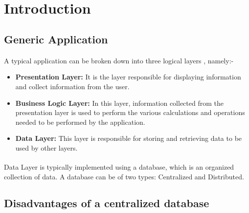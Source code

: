 \documentclass[12pt]{article}
\begin{document}
\clearpage

\tableofcontents
\clearpage
{}
\listoffigures
\printglossaries
{}

\section{Introduction}
    \subsection{Generic Application}
        \paragraph{} A typical application can be broken down into three logical layers \cite{wikimulti}, namely:-
        \begin{itemize}
            \item \textbf{Presentation Layer: }It is the layer responsible for displaying information and collect information from the user.
            \item \textbf{Business Logic Layer: }In this layer, information collected from the presentation layer is used to perform the various calculations and operations needed to be performed by the application.
            \item \textbf{Data Layer: }This layer is responsible for storing and retrieving data to be used by other layers.
        \end{itemize}

        \paragraph{}Data Layer is typically implemented using a database, which is an organized collection of data. A database can be of two types: Centralized and Distributed.
        
    \subsection{Disadvantages of a centralized database}
\end{document}
